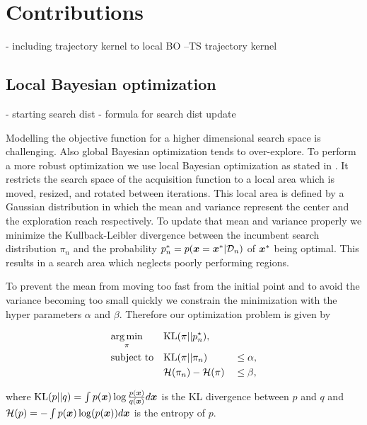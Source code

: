 \chapter{Contributions}
\label{chap:contributions}

- including trajectory kernel to local BO
--TS trajectory kernel

\section{Local Bayesian optimization}

- starting search dist
- formula for search dist update

Modelling the objective function for a higher dimensional search space is challenging. Also global Bayesian optimization tends to over-explore. To perform a more robust optimization we use local Bayesian optimization as stated in \cite{akrour2017local}. It restricts the search space of the acquisition function to a local area which is moved, resized, and rotated between iterations. This local area is defined by a Gaussian distribution in which the mean and variance represent the center and the exploration reach respectively. To update that mean and variance properly we minimize the Kullback-Leibler divergence between the incumbent search distribution $\pi_n$ and the probability $p_n^* = p({\boldsymbol{x}}={\boldsymbol{x}}^*|\mathcal{D}_n)$ of ${\boldsymbol{x}}^*$ being optimal. This results in a search area which neglects poorly performing regions.

To prevent the mean from moving too fast from the initial point and to avoid the variance becoming too small quickly we constrain the minimization with the hyper parameters $\alpha$ and $\beta$. Therefore our optimization problem is given by

\begin{align}
    & \underset{\pi}{\arg\min} & & \mathrm{KL}(\pi||p_n^\star),& &\notag\\
    & \text{subject to}
    & & \mathrm{KL}(\pi||\pi_n) & &\leq \alpha,\label{eq:kl:our}\\
    & & &{\cal H}(\pi_n) - {\cal H}(\pi) & &\leq \beta,\label{eq:entropy:our}
\end{align}

where $\mathrm{KL}(p||q) = \int p({\boldsymbol{x}}) \log \frac{p({\boldsymbol{x}})}{q({\boldsymbol{x}})} d{\boldsymbol{x}}$ is the KL divergence between $p$ and $q$ and ${\cal H}(p) = -\int p({\boldsymbol{x}})\log(p({\boldsymbol{x}})) d{\boldsymbol{x}}$ is the entropy of $p$.

